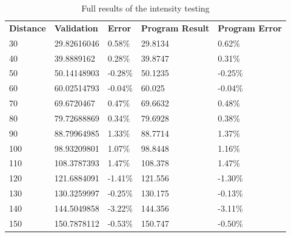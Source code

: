 \documentclass[conference]{IEEEtran}
\begin{document}
\begin{table}[H]
\caption{Full results of the intensity testing}
\label{tab:T4_full}
\begin{tabular}{lllll}
\textbf{Distance} & \textbf{Validation} & \textbf{Error} & \textbf{Program Result} & \textbf{Program Error} \\
30                & 29.82616046         & 0.58\%         & 29.8134                 & 0.62\%                 \\
40                & 39.8889162          & 0.28\%         & 39.8747                 & 0.31\%                 \\
50                & 50.14148903         & -0.28\%        & 50.1235                 & -0.25\%                \\
60                & 60.02514793         & -0.04\%        & 60.025                  & -0.04\%                \\
70                & 69.6720467          & 0.47\%         & 69.6632                 & 0.48\%                 \\
80                & 79.72688869         & 0.34\%         & 79.6928                 & 0.38\%                 \\
90                & 88.79964985         & 1.33\%         & 88.7714                 & 1.37\%                 \\
100               & 98.93209801         & 1.07\%         & 98.8448                 & 1.16\%                 \\
110               & 108.3787393         & 1.47\%         & 108.378                 & 1.47\%                 \\
120               & 121.6884091         & -1.41\%        & 121.556                 & -1.30\%                \\
130               & 130.3259997         & -0.25\%        & 130.175                 & -0.13\%                \\
140               & 144.5049858         & -3.22\%        & 144.356                 & -3.11\%                \\
150               & 150.7878112         & -0.53\%        & 150.747                 & -0.50\%               
\end{tabular}
\end{table}
\newpage
\end{document}

